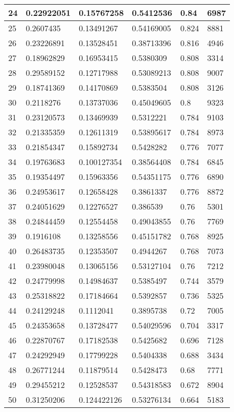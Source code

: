 \begin{longtable}{|l|l|l|l|l|l|}
24 & 0.22922051 & 0.15767258 & 0.5412536 & 0.84 & 6987 \\ \hline 
25 & 0.2607435 & 0.13491267 & 0.54169005 & 0.824 & 8881 \\ \hline 
26 & 0.23226891 & 0.13528451 & 0.38713396 & 0.816 & 4946 \\ \hline 
27 & 0.18962829 & 0.16953415 & 0.5380309 & 0.808 & 3314 \\ \hline 
28 & 0.29589152 & 0.12717988 & 0.53089213 & 0.808 & 9007 \\ \hline 
29 & 0.18741369 & 0.14170869 & 0.5383504 & 0.808 & 3126 \\ \hline 
30 & 0.2118276 & 0.13737036 & 0.45049605 & 0.8 & 9323 \\ \hline 
31 & 0.23120573 & 0.13469939 & 0.5312221 & 0.784 & 9103 \\ \hline 
32 & 0.21335359 & 0.12611319 & 0.53895617 & 0.784 & 8973 \\ \hline 
33 & 0.21854347 & 0.15892734 & 0.5428282 & 0.776 & 7077 \\ \hline 
34 & 0.19763683 & 0.100127354 & 0.38564408 & 0.784 & 6845 \\ \hline 
35 & 0.19354497 & 0.15963356 & 0.54351175 & 0.776 & 6890 \\ \hline 
36 & 0.24953617 & 0.12658428 & 0.3861337 & 0.776 & 8872 \\ \hline 
37 & 0.24051629 & 0.12276527 & 0.386539 & 0.76 & 5301 \\ \hline 
38 & 0.24844459 & 0.12554458 & 0.49043855 & 0.76 & 7769 \\ \hline 
39 & 0.1916108 & 0.13258556 & 0.45151782 & 0.768 & 8925 \\ \hline 
40 & 0.26483735 & 0.12353507 & 0.4944267 & 0.768 & 7073 \\ \hline 
41 & 0.23980048 & 0.13065156 & 0.53127104 & 0.76 & 7212 \\ \hline 
42 & 0.24779998 & 0.14984637 & 0.5385497 & 0.744 & 3579 \\ \hline 
43 & 0.25318822 & 0.17184664 & 0.5392857 & 0.736 & 5325 \\ \hline 
44 & 0.24129248 & 0.1112041 & 0.3895738 & 0.72 & 7005 \\ \hline 
45 & 0.24353658 & 0.13728477 & 0.54029596 & 0.704 & 3317 \\ \hline 
46 & 0.22870767 & 0.17182538 & 0.5425682 & 0.696 & 7128 \\ \hline 
47 & 0.24292949 & 0.17799228 & 0.5404338 & 0.688 & 3434 \\ \hline 
48 & 0.26771244 & 0.11879514 & 0.5428473 & 0.68 & 7771 \\ \hline 
49 & 0.29455212 & 0.12528537 & 0.54318583 & 0.672 & 8904 \\ \hline 
50 & 0.31250206 & 0.124422126 & 0.53276134 & 0.664 & 5183 \\ \hline 
\end{longtable}